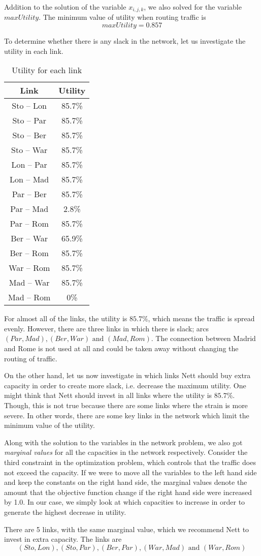 Addition to the solution of the variable $x_{i,j,k}$, we also solved for the variable $maxUtility$. The minimum value of utility when routing traffic is $$maxUtility = 0.857$$

To determine whether there is any slack in the network, let us investigate the utility in each link.

\begin{table}[H]
\centering
\caption{Utility for each link}
\label{}
\begin{tabular}{|c|c|} \hline
        Link & Utility				\\ \hline
Sto -- Lon & 85.7\%   \\
Sto -- Par & 85.7\%        \\
Sto -- Ber & 85.7\%     \\
Sto -- War & 85.7\%		\\
Lon -- Par & 85.7\%    \\
Lon -- Mad & 85.7\%       \\
Par -- Ber & 85.7\%    \\
Par -- Mad & 2.8\%     \\
Par -- Rom & 85.7\%    \\
Ber -- War & 65.9\%       \\
Ber -- Rom & 85.7\%     \\
War -- Rom & 85.7\%    \\
Mad -- War & 85.7\%        \\
Mad -- Rom & 0\%      \\ \hline
\end{tabular}
\end{table}

For almost all of the links, the utility is $85.7\%$, which means the traffic is spread evenly. However, there are three links in which there is slack; arcs $(Par,Mad), (Ber,War) \text{ and } (Mad,Rom)$. The connection between Madrid and Rome is not used at all and could be taken away without changing the routing of traffic.

On the other hand, let us now investigate in which links Nett should buy extra capacity in order to create more slack, i.e. decrease the maximum utility. One might think that Nett should invest in all links where the utility is $85.7\%$. Though, this is not true because there are some links where the strain is more severe. In other words, there are some key links in the network which limit the minimum value of the utility.

Along with the solution to the variables in the network problem, we also got \textit{marginal values} for all the capacities in the network respectively. Consider the third constraint in the optimization problem, which controls that the traffic does not exceed the capacity. If we were to move all the variables to the left hand side and keep the constants on the right hand side, the marginal values denote the amount that the objective function change if the right hand side were increased by 1.0. In our case, we simply look at which capacities to increase in order to generate the highest decrease in utility.

There are 5 links, with the same marginal value, which we recommend Nett to invest in extra capacity. The links are
$$
(Sto,Lon), (Sto,Par), (Ber,Par), (War,Mad) \text{ and }(War,Rom)
$$